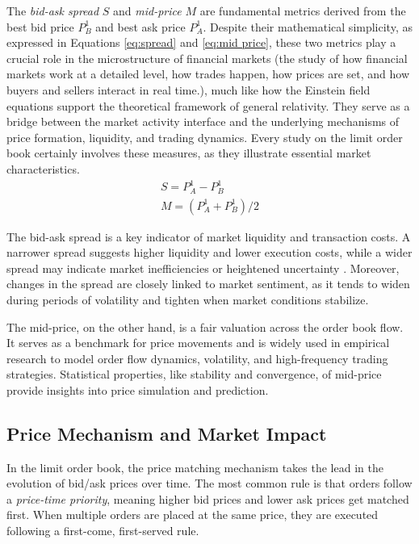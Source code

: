 The \textit{bid-ask spread} $S$ and \textit{mid-price} $M$ are fundamental metrics derived from the best bid price $P_B ^ {1}$ and best ask price $P_A ^ {1}$. Despite their mathematical simplicity, as expressed in Equations \ref{eq:spread} and \ref{eq:mid price}, these two metrics play a crucial role in the microstructure of financial markets (the study of how financial markets work at a detailed level, how trades happen, how prices are set, and how buyers and sellers interact in real time.), much like how the Einstein field equations support the theoretical framework of general relativity. They serve as a bridge between the market activity interface and the underlying mechanisms of price formation, liquidity, and trading dynamics. Every study on the limit order book certainly involves these measures, as they illustrate essential market characteristics.
\begin{align}
    S = P_A ^ {1} - P_B ^ {1}  \label{eq:spread}\\
    M = (P_A ^ {1} + P_B ^ {1})/2
    \label{eq:mid price}
\end{align}

The bid-ask spread is a key indicator of market liquidity and transaction costs. A narrower spread suggests higher liquidity and lower execution costs, while a wider spread may indicate market inefficiencies or heightened uncertainty \citep{GLOSTEN198571}. Moreover, changes in the spread are closely linked to market sentiment, as it tends to widen during periods of volatility and tighten when market conditions stabilize.

The mid-price, on the other hand, is a fair valuation across the order book flow. It serves as a benchmark for price movements and is widely used in empirical research to model order flow dynamics, volatility, and high-frequency trading strategies. Statistical properties, like stability and convergence, of mid-price provide insights into price simulation and prediction. 

\subsection{Price Mechanism and Market Impact}
In the limit order book, the price matching mechanism takes the lead in the evolution of bid/ask prices over time. The most common rule is that orders follow a \textit{price-time priority}, meaning higher bid prices and lower ask prices get matched first. When multiple orders are placed at the same price, they are executed following a first-come, first-served rule. 

